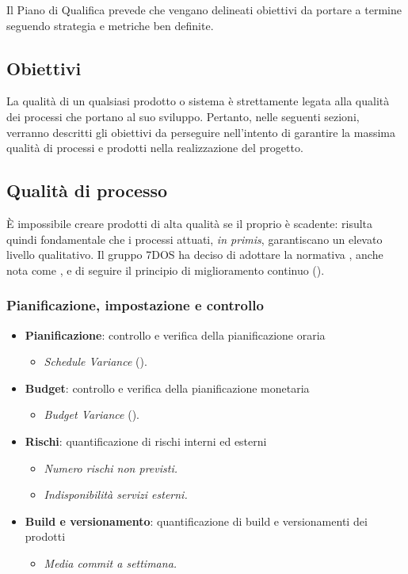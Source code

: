 Il Piano di Qualifica prevede che vengano delineati obiettivi da portare a termine seguendo strategia e metriche ben definite.
\subsection{Obiettivi}
La qualità di un qualsiasi prodotto o sistema è strettamente legata alla qualità dei processi che portano al suo sviluppo. Pertanto, nelle seguenti sezioni, verranno descritti gli obiettivi da perseguire nell'intento di garantire la massima qualità di processi e prodotti nella realizzazione del progetto.
\subsection{Qualità di processo}
	È impossibile creare prodotti di alta qualità se il proprio  è scadente: risulta quindi fondamentale che i processi attuati, \emph{in primis}, garantiscano un elevato livello qualitativo. Il gruppo 7DOS ha deciso di adottare la normativa , anche nota come , e di seguire il principio di miglioramento continuo (). 

\subsubsection{Pianificazione, impostazione e controllo}

\begin{itemize}
	\item{\textbf{Pianificazione}: controllo e verifica della pianificazione oraria
	\begin{itemize}
		\item{\emph{Schedule Variance} ().}
	\end{itemize}	
	}
	\item{\textbf{Budget}: controllo e verifica della pianificazione monetaria
		\begin{itemize}
			\item{\emph{Budget Variance} ().}
		\end{itemize}	
	}
	\item{\textbf{Rischi}: quantificazione di rischi interni ed esterni
	\begin{itemize}
		\item\emph{Numero rischi non previsti.}
		\item\emph{Indisponibilità servizi esterni.}	
	\end{itemize}	
	}
	\item{\textbf{Build e versionamento}: quantificazione di build e versionamenti dei prodotti
	\begin{itemize}
		\item\emph{Media commit a settimana.}
	\end{itemize}	
	}
\end{itemize}
